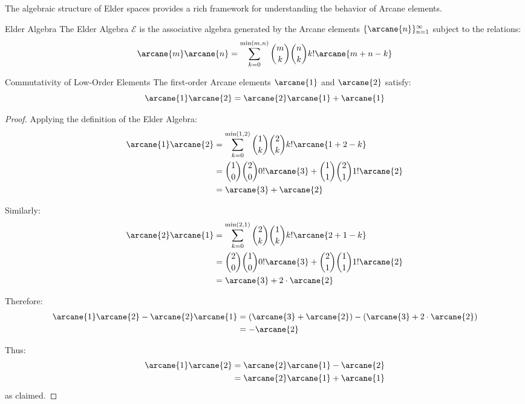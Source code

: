 \begin{twocolumnlayout}
The algebraic structure of Elder spaces provides a rich framework for understanding the behavior of Arcane elements.

\begin{definition}{Elder Algebra}{}
The Elder Algebra $\mathcal{E}$ is the associative algebra generated by the Arcane elements $\{\arcane{n}\}_{n=1}^{\infty}$ subject to the relations:
\begin{equation}
\arcane{m} \arcane{n} = \sum_{k=0}^{\min(m,n)} \binom{m}{k}\binom{n}{k}k!\arcane{m+n-k}
\end{equation}
\end{definition}

\begin{lemma}{Commutativity of Low-Order Elements}{}
The first-order Arcane elements $\arcane{1}$ and $\arcane{2}$ satisfy:
\begin{equation}
\arcane{1}\arcane{2} = \arcane{2}\arcane{1} + \arcane{1}
\end{equation}
\end{lemma}

\begin{proof}
Applying the definition of the Elder Algebra:
\begin{align}
\arcane{1}\arcane{2} &= \sum_{k=0}^{\min(1,2)} \binom{1}{k}\binom{2}{k}k!\arcane{1+2-k}\\
&= \binom{1}{0}\binom{2}{0}0!\arcane{3} + \binom{1}{1}\binom{2}{1}1!\arcane{2}\\
&= \arcane{3} + \arcane{2}
\end{align}

Similarly:
\begin{align}
\arcane{2}\arcane{1} &= \sum_{k=0}^{\min(2,1)} \binom{2}{k}\binom{1}{k}k!\arcane{2+1-k}\\
&= \binom{2}{0}\binom{1}{0}0!\arcane{3} + \binom{2}{1}\binom{1}{1}1!\arcane{2}\\
&= \arcane{3} + 2 \cdot \arcane{2}
\end{align}

Therefore:
\begin{align}
\arcane{1}\arcane{2} - \arcane{2}\arcane{1} &= (\arcane{3} + \arcane{2}) - (\arcane{3} + 2 \cdot \arcane{2})\\
&= -\arcane{2}
\end{align}

Thus:
\begin{align}
\arcane{1}\arcane{2} &= \arcane{2}\arcane{1} - \arcane{2}\\
&= \arcane{2}\arcane{1} + \arcane{1}
\end{align}
as claimed.
\end{proof}

\end{twocolumnlayout}


